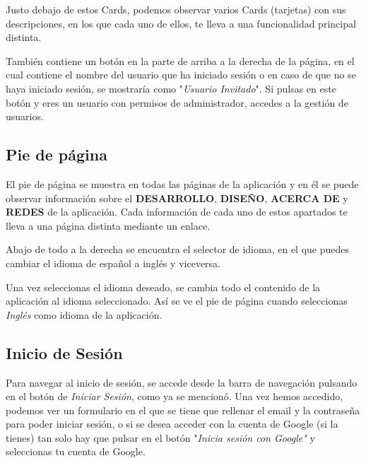 
Justo debajo de estos Cards, podemos observar varios Cards (tarjetas) con sus descripciones, en los que cada uno de ellos, te lleva a una funcionalidad principal distinta.


También contiene un botón en la parte de arriba a la derecha de la página, en el cual contiene el nombre del usuario que ha iniciado sesión o en caso de que no se haya iniciado sesión, se mostraría como "\textit{Usuario Invitado}". Si pulsas en este botón y eres un usuario con permisos de administrador, accedes a la gestión de usuarios.


\hfill

\subsection{Pie de página}

El pie de página se muestra en todas las páginas de la aplicación y en él se puede observar información sobre el \textbf{DESARROLLO}, \textbf{DISEÑO}, \textbf{ACERCA DE} y \textbf{REDES} de la aplicación. Cada información de cada uno de estos apartados te lleva a una página distinta mediante un enlace.


Abajo de todo a la derecha se encuentra el selector de idioma, en el que puedes cambiar el idioma de español a inglés y viceversa.


Una vez seleccionas el idioma deseado, se cambia todo el contenido de la aplicación al idioma seleccionado. Así se ve el pie de página cuando seleccionas \textit{Inglés} como idioma de la aplicación.


\hfill

\subsection{Inicio de Sesión}

Para navegar al inicio de sesión, se accede desde la barra de navegación pulsando en el botón de \textit{Iniciar Sesión}, como ya se mencionó. Una vez hemos accedido, podemos ver un formulario en el que se tiene que rellenar el email y la contraseña para poder iniciar sesión, o si se desea acceder con la cuenta de Google (si la tienes) tan solo hay que pulsar en el botón "\textit{Inicia sesión con Google"} y seleccionas tu cuenta de Google.

